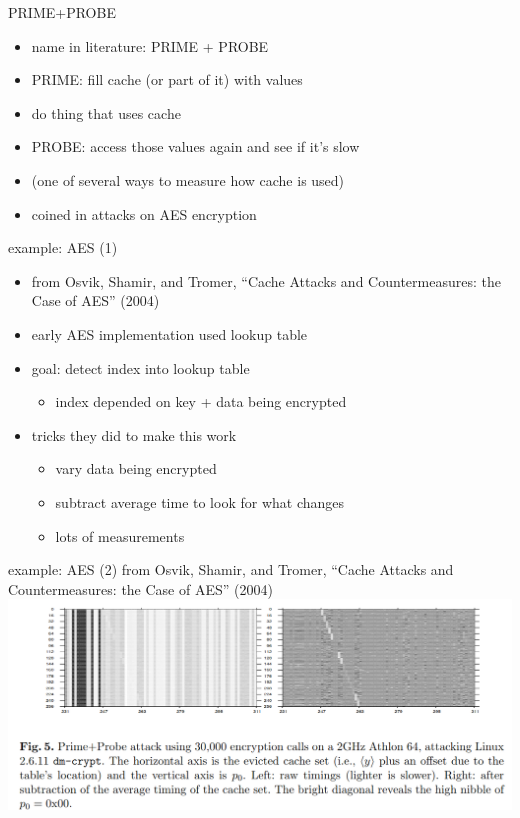 \begin{frame}{PRIME+PROBE}
    \begin{itemize}
    \item name in literature: PRIME + PROBE
    \item PRIME: fill cache (or part of it) with values
    \item do thing that uses cache
    \item PROBE: access those values again and see if it's slow
    \vspace{.5cm}
    \item (one of several ways to measure how cache is used)
    \vspace{.5cm}
    \item coined in attacks on AES encryption
    \end{itemize}
\end{frame}

\begin{frame}{example: AES (1)}
\begin{itemize}
\item from Osvik, Shamir, and Tromer, ``Cache Attacks and Countermeasures: the Case of AES'' (2004)
\item early AES implementation used lookup table
\item goal: detect index into lookup table
    \begin{itemize}
    \item index depended on key + data being encrypted
    \end{itemize}
\item tricks they did to make this work
    \begin{itemize}
    \item vary data being encrypted
    \item subtract average time to look for what changes
    \item lots of measurements
    \end{itemize}
\end{itemize}
\end{frame}

\begin{frame}{example: AES (2)}
\small from Osvik, Shamir, and Tromer, ``Cache Attacks and Countermeasures: the Case of AES'' (2004) \\
\includegraphics[width=1.0\textwidth]{../spectre/prime-probe-osvik}
\end{frame}
